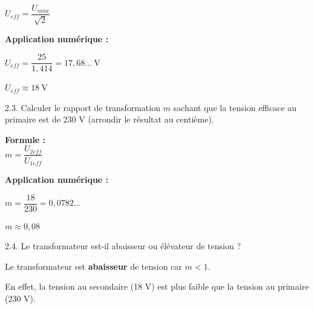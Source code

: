 \documentclass[11pt,a4paper]{article}
\begin{document}
\begin{enumerate}
\begin{minipage}{.55\textwidth}
\begin{tcolorbox}[colback=red!5!white,colframe=red!75!black]
$U_{eff} = \dfrac{U_{max}}{\sqrt{2}}$

\vspace{2mm}

\textbf{Application numérique :}

$U_{eff} = \dfrac{25}{1,414} = 17,68...~\text{V}$

\vspace{2mm}

$U_{eff} \approx \boxed{18~\text{V}}$
\end{tcolorbox}
\end{minipage}%
\hfill
\begin{minipage}{.35\textwidth}%
\centering
\centering
\osci[%
scale=0.5,
second channel=0,
screen offset one=0,
screen offset two=0,
time div=5,
voltage div one=10,
voltage div two=2,
sample rate=200,
xy mode=0,
func one=25*sin(2*180/0.020*x),
func two=3*sin(2*180/0.020*x+180),
color one=D62626,
color two=1053AF,
graph back color=FFFFFF,
info back color=D6D6D6,
info text color=000000,
main axis color=000000,
grid color=CCCCCC
]

\end{minipage}%

\end{enumerate}

\newpage 

2.3. Calculer le rapport de transformation $m$ sachant que la tension efficace au primaire est de 230 V (arrondir le résultat au centième). 

\begin{tcolorbox}[colback=red!5!white,colframe=red!75!black]
\begin{multicols}{2}

\textbf{Formule :}\\[2mm]

$m = \dfrac{U_{2eff}}{U_{1eff}}$

\columnbreak

\textbf{Application numérique :}

$m = \dfrac{18}{230} = 0,0782...$

\vspace{3mm}

$m \approx \boxed{0,08}$
\end{multicols}
\end{tcolorbox}

2.4. Le transformateur est-il abaisseur ou élévateur de tension ?
\vspace{5mm}

\begin{tcolorbox}[colback=red!5!white,colframe=red!75!black]
Le transformateur est \textbf{abaisseur} de tension car $m < 1$.

\vspace{2mm}

En effet, la tension au secondaire (18 V) est plus faible que la tension au primaire (230 V).
\end{tcolorbox}
\end{document}
